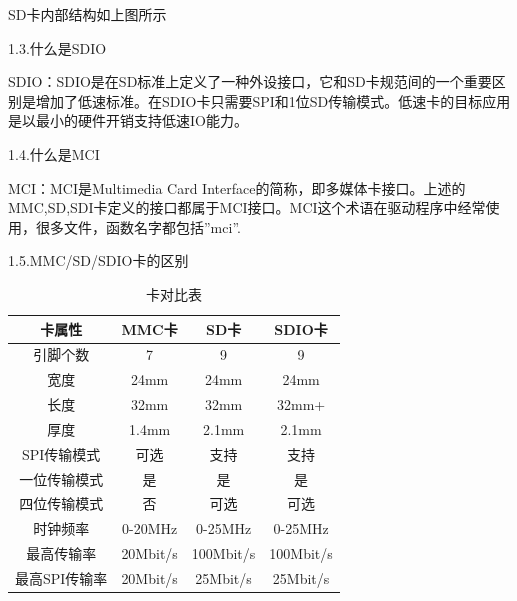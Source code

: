 SD卡内部结构如上图所示

1.3.什么是SDIO

SDIO：SDIO是在SD标准上定义了一种外设接口，它和SD卡规范间的一个重要区别是增加了低速标准。在SDIO卡只需要SPI和1位SD传输模式。低速卡的目标应用是以最小的硬件开销支持低速IO能力。

1.4.什么是MCI

MCI：MCI是Multimedia Card Interface的简称，即多媒体卡接口。上述的MMC,SD,SDI卡定义的接口都属于MCI接口。MCI这个术语在驱动程序中经常使用，很多文件，函数名字都包括”mci”.

1.5.MMC/SD/SDIO卡的区别

\begin{table}
    \centering
\begin{tabular}{|c|c|c|c|}
    \hline
    卡属性&MMC卡&SD卡&SDIO卡\\
    \hline
    引脚个数&7&9&9\\
    \hline
    宽度&24mm&24mm&24mm\\
    \hline
    长度&32mm&32mm&32mm+\\
    \hline
    厚度&1.4mm&2.1mm&2.1mm\\
    \hline
    SPI传输模式&可选&支持&支持\\
    \hline
    一位传输模式&是&是&是\\
    \hline
    四位传输模式&否&可选&可选\\
    \hline
    时钟频率&0-20MHz&0-25MHz&0-25MHz\\
    \hline
    最高传输率&20Mbit/s&100Mbit/s&100Mbit/s\\
    \hline
    最高SPI传输率&20Mbit/s&25Mbit/s&25Mbit/s\\
    \hline
  \end{tabular}
  \caption{卡对比表}
\end{table}


